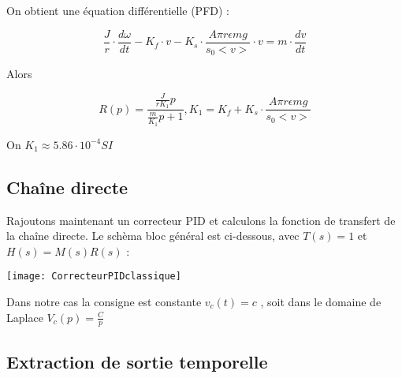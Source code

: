 \documentclass[11pt]{article} %
\begin{document}
On obtient une équation différentielle (PFD) :

\begin{equation} \frac{J}{r} \cdot \frac{d\omega}{dt} - K_f \cdot v - K_s \cdot  \frac{A\pi r \epsilon mg}{s_0<v>}  \cdot v = m \cdot \frac{dv}{dt}\end{equation}

Alors

\begin{equation} R(p) = \frac{\frac{J}{r K_1}p}{\frac{m}{K_1}p + 1} , K_1 = K_f + K_s \cdot \frac{A\pi r \epsilon mg}{s_0<v>} \end{equation}

On \begin{math} K_1 \approx 5.86 \cdot 10^{-4} SI \end{math}

\subsection{Chaîne directe}

Rajoutons maintenant un correcteur PID et calculons la fonction de transfert de la chaîne directe. Le schèma bloc général est ci-dessous, avec \begin{math} T(s) = 1 \end{math} et \begin{math} H(s) = M(s)R(s) \end{math} :

\texttt{[image: CorrecteurPIDclassique]} 

Dans notre cas la consigne est constante \begin{math} v_c(t) = c \end{math} , soit dans le domaine de Laplace \begin{math} V_c(p) = \frac{C}{p} \end{math}


\subsection{Extraction de sortie temporelle}
\end{document}
